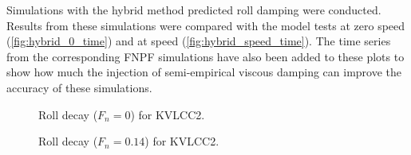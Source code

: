 Simulations with the hybrid method predicted roll damping were conducted. Results from these simulations were compared with the model tests at zero speed (\autoref{fig:hybrid_0_time}) and at speed (\autoref{fig:hybrid_speed_time}). The time series from the corresponding FNPF
simulations have also been added to these plots to show how much the injection of semi-empirical viscous damping can improve the accuracy of these simulations.
\begin{figure}[h]
\caption{Roll decay ($F_n=0$) for KVLCC2.}
\label{fig:hybrid_0_time}
\end{figure}
\begin{figure}[h]
\caption{Roll decay ($F_n=0.14$) for KVLCC2.}
\label{fig:hybrid_speed_time}
\end{figure}
\clearpage